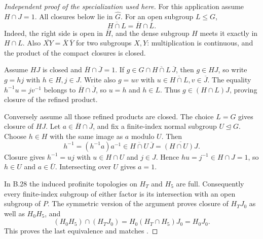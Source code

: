 \begin{proof}[Independent proof of the specialization used here]
For this application assume $H\cap J=1$.
All closures below lie in $\widehat G$.
For an open subgroup $L\leq G$,
\[
 \overline{H\cap L}=\overline H\cap\overline L.
\]
Indeed, the right side is open in $\overline H$, and the
dense subgroup $H$ meets it exactly in $H\cap L$.
Also $\overline{XY}=\overline X\,\overline Y$ for two
subgroups $X,Y$: multiplication is continuous, and the
product of the compact closures is closed.

Assume $HJ$ is closed and $\overline H\cap\overline J=1$.
If $g\in G\cap\overline{H\cap L}\,\overline J$, then
$g\in HJ$, so write $g=hj$ with $h\in H,j\in J$.
Write also $g=uv$ with
$u\in\overline{H\cap L},v\in\overline J$.
The equality $h^{-1}u=jv^{-1}$ belongs to
$\overline H\cap\overline J$, so $u=h$ and $h\in L$.
Thus $g\in(H\cap L)J$, proving closure of the refined product.

Conversely assume all those refined products are closed.
The choice $L=G$ gives closure of $HJ$.
Let $a\in\overline H\cap\overline J$, and fix a
finite-index normal subgroup $U\trianglelefteq G$.
Choose $h\in H$ with the same image as $a$ modulo $U$.
Then
\[
 h^{-1}=(h^{-1}a)a^{-1}
 \in\overline{H\cap U}\,\overline J
       =\overline{(H\cap U)J}.
\]
Closure gives $h^{-1}=uj$ with $u\in H\cap U$ and
$j\in J$.  Hence $hu=j^{-1}\in H\cap J=1$, so
$h\in U$ and $a\in\overline U$.  Intersecting over $U$
gives $a=1$.

In B.28 the induced profinite topologies on $H_T$ and $H_5$
are full.  Consequently every finite-index subgroup of either
factor is its intersection with an open subgroup of $P$.
The symmetric version of the argument proves closure of
$H_TJ_0$ as well as $H_0H_5$, and
\[
 (H_0H_5)\cap(H_TJ_0)=H_0(H_T\cap H_5)J_0=H_0J_0.
\]
This proves the last equivalence and matches
\cite[Corollary 3.2]{DE_Minasyan2023}.
\end{proof}

